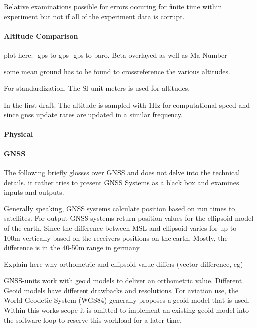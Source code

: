 Relative examinations possible for errors occuring for finite time within experiment but not if all of the experiment data is corrupt.

\paragraph{Altitude Comparison}

plot here: -gps to gps -gps to baro. Beta overlayed as well as Ma Number




some mean ground has to be found to crossreference the various altitudes.

For standardization. The SI-unit meters is used for altitudes.

In the first draft. The altitude is sampled with 1Hz for computational speed and since gnss update rates are updated in a similar frequency.

\paragraph{ Physical}

\paragraph{ GNSS}

The following briefly glosses over GNSS and does not delve into the technical details. it rather tries to present GNSS Systems as a black box and examines inputs and outputs.

Generally speaking, GNSS systems calculate position based on run times to satellites. For output GNSS systems return position values for the ellipsoid model of the earth. Since the difference between MSL and ellipsoid varies for up to 100m vertically based on the receivers positions on the earth. Mostly, the difference is in the 40-50m range in germany.

Explain here why orthometric and ellipsoid value differs (vector difference, cg)

GNSS-units work with geoid models to deliver an orthometric value. Different Geoid models have different drawbacks and resolutions. For aviation use, the World Geodetic System (WGS84) generally proposes a geoid model that is used. Within this works scope it is omitted to implement an existing geoid model into the software-loop to reserve this workload for a later time.
